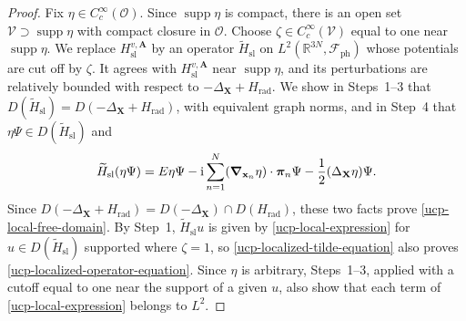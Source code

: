 \documentclass[final,reqno]{amsart}
\DeclareMathOperator{\supp}{supp}
\theoremstyle{remark}
\newcommand{\RR}{\mathbb{R}}
\renewcommand{\i}{\mathrm{i}}
\newcommand{\DC}{D}
\newcommand{\ph}{\mathrm{ph}}
\newcommand{\rad}{\mathrm{rad}}
\newcommand{\Fock}{\mathcal{F}}
\newcommand{\vpi}{{\bm{\pi}}}
\newcommand{\vx}{\mathbf{x}}
\newcommand{\vA}{{\mathbf{A}}}
\newcommand{\vX}{{\mathbf{X}}}
\begin{document}
\begin{proof}
Fix $\eta\in C_c^\infty(\mathcal O)$.  Since $\supp\eta$ is compact,
there is an open set $\mathcal V\supset\supp\eta$ with compact closure
in $\mathcal O$.  Choose $\zeta\in C_c^\infty(\mathcal V)$ equal to one
near $\supp\eta$.  We replace $H_{\mathrm{sl}}^{v,\vA}$ by an operator
$\widetilde H_{\mathrm{sl}}$ on $L^2(\RR^{3N},\Fock_\ph)$ whose
potentials are cut off by $\zeta$.  It agrees with
$H_{\mathrm{sl}}^{v,\vA}$ near $\supp\eta$, and its perturbations are
relatively bounded with respect to $-\Delta_{\vX}+H_\rad$.  We show
in Steps~1--3 that
$\DC(\widetilde H_{\mathrm{sl}})=\DC(-\Delta_{\vX}+H_\rad)$, with
equivalent graph norms, and in Step~4 that
$\eta\Psi\in\DC(\widetilde H_{\mathrm{sl}})$ and
\begin{equation}\label{ucp-localized-tilde-equation}
 \widetilde H_{\mathrm{sl}}(\eta\Psi)
 =E\eta\Psi-\i\sum_{n=1}^N(\grad_{\vx_n}\eta)\cdot\vpi_n\Psi
                         -\frac12(\Delta_{\vX}\eta)\Psi.
\end{equation}
Since $\DC(-\Delta_{\vX}+H_\rad)=\DC(-\Delta_{\vX})\cap\DC(H_\rad)$,
these two facts prove \cref{ucp-local-free-domain}.  By Step~1,
$\widetilde H_{\mathrm{sl}}u$ is given by \cref{ucp-local-expression}
for $u\in\DC(\widetilde H_{\mathrm{sl}})$ supported where $\zeta=1$, so
\cref{ucp-localized-tilde-equation} also proves
\cref{ucp-localized-operator-equation}.  Since $\eta$ is
arbitrary, Steps~1--3, applied with a cutoff equal to one near the
support of a given $u$, also show that each term of
\cref{ucp-local-expression} belongs to $L^2$.


\end{proof}
\end{document}
